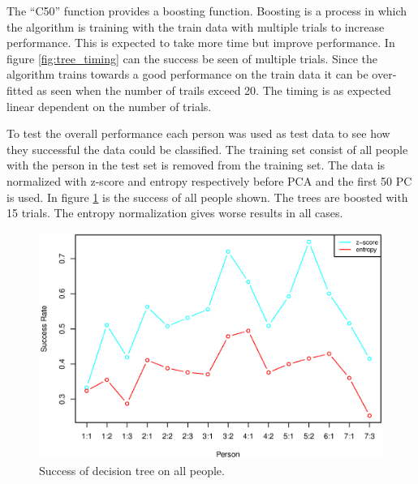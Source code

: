 The ``C50'' function provides a boosting function.
Boosting is a process in which the algorithm is training with the train data with multiple trials to increase performance.
This is expected to take more time but improve performance.
In figure \ref{fig:tree_timing} can the success be seen of multiple trials.
Since the algorithm trains towards a good performance on the train data it can be over-fitted as seen when the number of trails exceed 20. 
The timing is as expected linear dependent on the number of trials.

To test the overall performance each person was used as test data to see how they successful the data could be classified.
The training set consist of all people with the person in the test set is removed from the training set. 
The data is normalized with z-score and entropy respectively before PCA and the first 50 PC is used. 
In figure \ref{fig:tree_success_all} is the success of all people shown.
The trees are boosted with 15 trials.
The entropy normalization gives worse results in all cases.

\begin{figure}[H]
\includegraphics[width = \textwidth]{graphics/tree_success_all}
\caption{Success of decision tree on all people.}
\label{fig:tree_success_all}
\end{figure}
